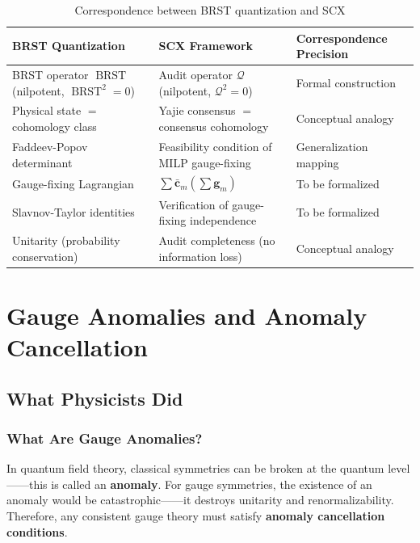 \documentclass[12pt,a4paper]{article}
\theoremstyle{remark}
\newcommand{\gaugeparam}{\mathbf{g}}
\DeclareMathOperator{\BRST}{BRST}
\begin{document}
\begin{table}[H]
\centering
\caption{Correspondence between BRST quantization and SCX}
\label{tab:brst_correspondence}
\begin{tabular}{p{4.5cm} p{4.5cm} p{4.5cm}}
\toprule
\textbf{BRST Quantization} & \textbf{SCX Framework} & \textbf{Correspondence Precision} \\
\midrule
BRST operator $\BRST$ (nilpotent, $\BRST^2=0$) & Audit operator $\mathcal{Q}$ (nilpotent, $\mathcal{Q}^2=0$) & Formal construction \\
Physical state $=$ cohomology class & Yajie consensus $=$ consensus cohomology & Conceptual analogy \\
Faddeev-Popov determinant & Feasibility condition of MILP gauge-fixing & Generalization mapping \\
Gauge-fixing Lagrangian & $\sum\bar{\mathbf{c}}_m(\sum\gaugeparam_m)$ & To be formalized \\
Slavnov-Taylor identities & Verification of gauge-fixing independence & To be formalized \\
Unitarity (probability conservation) & Audit completeness (no information loss) & Conceptual analogy \\
\bottomrule
\end{tabular}
\end{table}

\newpage

\section{Gauge Anomalies and Anomaly Cancellation}

\subsection{What Physicists Did}

\subsubsection{What Are Gauge Anomalies?}

In quantum field theory, classical symmetries can be broken at the quantum level——this is called an \textbf{anomaly}.
For gauge symmetries, the existence of an anomaly would be catastrophic——it destroys unitarity and renormalizability.
Therefore, any consistent gauge theory must satisfy \textbf{anomaly cancellation conditions}.
\end{document}
